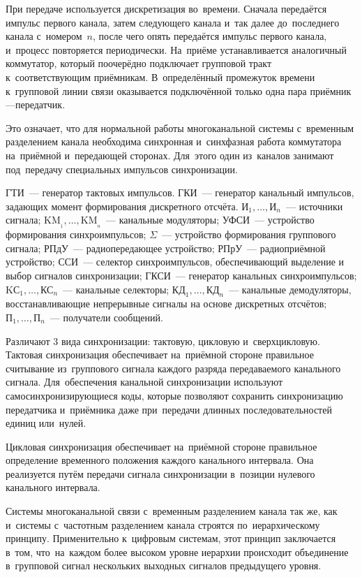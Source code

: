 \documentclass[
	a4paper,
	oneside,
	BCOR = 10mm,
	DIV = 12,
	12pt,
	headings = normal,
]{scrartcl}
\begin{document}
					При передаче используется дискретизация во~времени. Сначала передаётся импульс первого канала, затем следующего канала и~так далее до~последнего канала с~номером~$n$, после чего опять передаётся импульс первого канала, и~процесс повторяется периодически. На~приёме устанавливается аналогичный коммутатор, который поочерёдно подключает групповой тракт к~соответствующим приёмникам. В~определённый промежуток времени к~групповой линии связи оказывается подключённой только одна пара приёмник—передатчик.

					Это означает, что для нормальной работы многоканальной системы с~временным разделением канала необходима синхронная и~синхфазная работа коммутатора на~приёмной и~передающей сторонах. Для~этого один из~каналов занимают под~передачу специальных импульсов синхронизации. 

					ГТИ~— генератор тактовых импульсов. ГКИ~— генератор канальный импульсов, задающих момент формирования дискретного отсчёта. $\text{И}_1, \dots, \text{И}_n$~— источники сигнала; $\text{KM}_{_1}, \dots, \text{KM}_{_n}$~— канальные модуляторы; УФСИ~— устройство формирования синхроимпульсов; $\Sigma$~— устройство формирования группового сигнала; РПдУ~— радиопередающее устройство; РПрУ~— радиоприёмной устройство; ССИ~— селектор синхроимпульсов, обеспечивающий выделение и выбор сигналов синхронизации; ГКСИ~— генератор канальных синхроимпульсов; $\text{KС}_1, \dots, \text{КС}_n$~— канальные селекторы; $\text{КД}_{1}, \dots, \text{КД}_{n}$~— канальные демодуляторы, восстанавливающие непрерывные сигналы на основе дискретных отсчётов; $\text{П}_1, \dots, \text{П}_{n}$~— получатели сообщений.

					Различают 3 вида синхронизации: тактовую, цикловую и~сверхцикловую. Тактовая синхронизация обеспечивает на~приёмной стороне правильное считывание из~группового сигнала каждого разряда передаваемого канального сигнала. Для~обеспечения канальной синхронизации используют самосинхронизирующиеся коды, которые позволяют сохранить синхронизацию передатчика и~приёмника даже при~передачи длинных последовательностей единиц или~нулей.

					Цикловая синхронизация обеспечивает на~приёмной стороне правильное определение временного положения каждого канального интервала. Она реализуется путём передачи сигнала синхронизации в~позиции нулевого канального интервала.

					Системы многоканальной связи с~временным разделением канала так же, как и~системы с~частотным разделением канала строятся по~иерархическому принципу. Применительно к~цифровым системам, этот принцип заключается в~том, что~на~каждом более высоком уровне иерархии происходит объединение в~групповой сигнал нескольких выходных сигналов предыдущего уровня.
\end{document}
